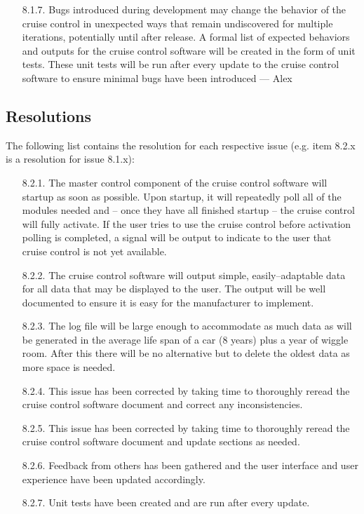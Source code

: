 \documentclass{article}
\begin{document}
\begin{enumerate}
		\item[8.1.7.] Bugs introduced during development may change the behavior of the cruise control in unexpected ways that remain undiscovered for multiple iterations, potentially until after release. A formal list of expected behaviors and outputs for the cruise control software will be created in the form of unit tests. These unit tests will be run after every update to the cruise control software to ensure minimal bugs have been introduced --- Alex
	\end{enumerate}

	\subsection{Resolutions}
	The following list contains the resolution for each respective issue (e.g. item 8.2.x is a resolution for issue 8.1.x):
	\begin{enumerate}
		\item[8.2.1.] The master control component of the cruise control software will startup as soon as possible. Upon startup, it will repeatedly poll all of the modules needed and -- once they have all finished startup -- the cruise control will fully activate. If the user tries to use the cruise control before activation polling is completed, a signal will be output to indicate to the user that cruise control is not yet available.
		
		\item[8.2.2.] The cruise control software will output simple, easily--adaptable data for all data that may be displayed to the user. The output will be well documented to ensure it is easy for the manufacturer to implement.
		
		\item[8.2.3.] The log file will be large enough to accommodate as much data as will be generated in the average life span of a car (8 years) plus a year of wiggle room. After this there will be no alternative but to delete the oldest data as more space is needed.
		
		\item[8.2.4.] This issue has been corrected by taking time to thoroughly reread the cruise control software document and correct any inconsistencies.
		
		\item[8.2.5.] This issue has been corrected by taking time to thoroughly reread the cruise control software document and update sections as needed.
		
		\item[8.2.6.] Feedback from others has been gathered and the user interface and user experience have been updated accordingly.
		
		\item[8.2.7.] Unit tests have been created and are run after every update.
	\end{enumerate}
	
\end{document}

